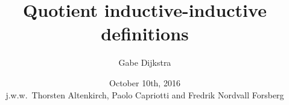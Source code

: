 

\title{Quotient inductive-inductive definitions}

\author[Gabe Dijkstra]{
  Gabe Dijkstra
}


\date[October 10th, 2016]{October 10th, 2016 \\ \vspace{1cm} \small{j.w.w.\ Thorsten Altenkirch, Paolo Capriotti and Fredrik Nordvall Forsberg}}




\begin{frame}
\maketitle
\end{frame}



